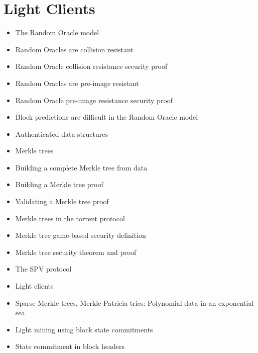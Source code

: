 \chapter{Light Clients}

{\color{red}
\begin{itemize}
\item The Random Oracle model
\item Random Oracles are collision resistant
\item Random Oracle collision resistance security proof
\item Random Oracles are pre-image resistant
\item Random Oracle pre-image resistance security proof
\item Block predictions are difficult in the Random Oracle model
\item Authenticated data structures
\item Merkle trees
\item Building a complete Merkle tree from data
\item Building a Merkle tree proof
\item Validating a Merkle tree proof
\item Merkle trees in the torrent protocol
\item Merkle tree game-based security definition
\item Merkle tree security theorem and proof
\item The SPV protocol
\item Light clients
\item Sparse Merkle trees, Merkle-Patricia tries: Polynomial data in an exponential sea
\item Light mining using block state commitments
\item State commitment in block headers
\end{itemize}
}
